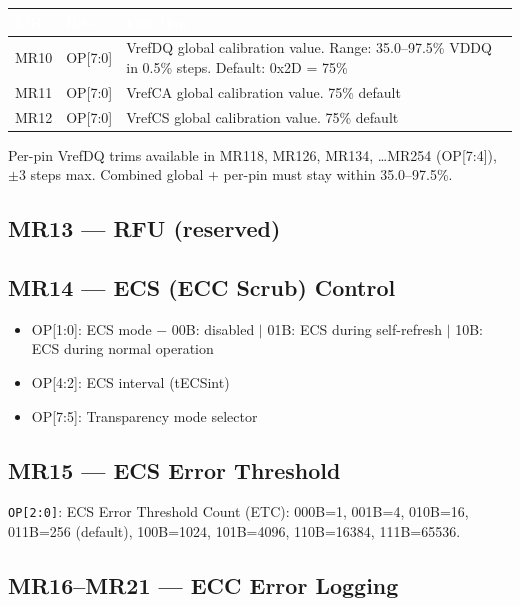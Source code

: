 \documentclass[10pt,a4paper,twoside]{article}
\newcommand{\thd}[1]{\cellcolor{navyblue}\textcolor{white}{\textbf{#1}}}
\newcommand{\trow}{\rowcolor{lightgray}}
\newcommand{\talt}{\rowcolor{skyblue!30}}
\begin{document}
\begin{center}
\begin{tabularx}{\linewidth}{@{} l l X @{}}
\toprule
\thd{MR} & \thd{Bits} & \thd{Function} \\
\midrule
\trow MR10 & OP[7:0] & VrefDQ global calibration value. Range: 35.0--97.5\% VDDQ in 0.5\% steps. Default: 0x2D = 75\% \\
\talt MR11 & OP[7:0] & VrefCA global calibration value. 75\% default \\
\trow MR12 & OP[7:0] & VrefCS global calibration value. 75\% default \\
\bottomrule
\end{tabularx}
\end{center}

Per-pin VrefDQ trims available in MR118, MR126, MR134, \ldots MR254 (OP[7:4]),
$\pm$3 steps max. Combined global + per-pin must stay within 35.0--97.5\%.

\subsection{MR13 --- RFU (reserved)}

\subsection{MR14 --- ECS (ECC Scrub) Control}

\begin{itemize}
  \item OP[1:0]: ECS mode $-$ 00B: disabled $|$ 01B: ECS during self-refresh $|$ 10B: ECS during normal operation
  \item OP[4:2]: ECS interval (tECSint)
  \item OP[7:5]: Transparency mode selector
\end{itemize}

\subsection{MR15 --- ECS Error Threshold}

\texttt{OP[2:0]}: ECS Error Threshold Count (ETC):
000B=1, 001B=4, 010B=16, 011B=256 (default), 100B=1024, 101B=4096, 110B=16384, 111B=65536.

\subsection{MR16--MR21 --- ECC Error Logging}
\end{document}
